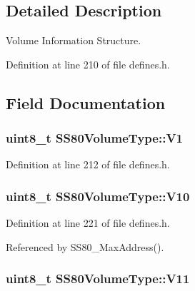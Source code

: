 \subsection{Detailed Description}
Volume Information Structure. 

Definition at line 210 of file defines.\+h.



\subsection{Field Documentation}
\subsubsection[{\texorpdfstring{V1}{V1}}]{\setlength{\rightskip}{0pt plus 5cm}uint8\+\_\+t S\+S80\+Volume\+Type\+::\+V1}\hypertarget{structSS80VolumeType_a42641e28498bceac017fcc016f7441a5}{}\label{structSS80VolumeType_a42641e28498bceac017fcc016f7441a5}


Definition at line 212 of file defines.\+h.

\subsubsection[{\texorpdfstring{V10}{V10}}]{\setlength{\rightskip}{0pt plus 5cm}uint8\+\_\+t S\+S80\+Volume\+Type\+::\+V10}\hypertarget{structSS80VolumeType_a5417c71bb5987247189a7cef0c47f333}{}\label{structSS80VolumeType_a5417c71bb5987247189a7cef0c47f333}


Definition at line 221 of file defines.\+h.



Referenced by S\+S80\+\_\+\+Max\+Address().

\subsubsection[{\texorpdfstring{V11}{V11}}]{\setlength{\rightskip}{0pt plus 5cm}uint8\+\_\+t S\+S80\+Volume\+Type\+::\+V11}\hypertarget{structSS80VolumeType_a2d8a582e92f18564ced53fc8e5549e53}{}\label{structSS80VolumeType_a2d8a582e92f18564ced53fc8e5549e53}


